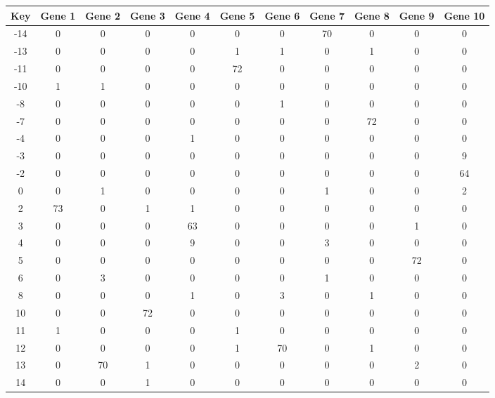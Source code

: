 \begin{tabular}{|c|c|c|c|c|c|c|c|c|c|c|}
\hline
Key & Gene 1 & Gene 2 & Gene 3 & Gene 4 & Gene 5 & Gene 6 & Gene 7 & Gene 8 & Gene 9 & Gene 10 \\
\hline
-14 & 0 & 0 & 0 & 0 & 0 & 0 & 70 & 0 & 0 & 0 \\
-13 & 0 & 0 & 0 & 0 & 1 & 1 & 0 & 1 & 0 & 0 \\
-11 & 0 & 0 & 0 & 0 & 72 & 0 & 0 & 0 & 0 & 0 \\
-10 & 1 & 1 & 0 & 0 & 0 & 0 & 0 & 0 & 0 & 0 \\
-8 & 0 & 0 & 0 & 0 & 0 & 1 & 0 & 0 & 0 & 0 \\
-7 & 0 & 0 & 0 & 0 & 0 & 0 & 0 & 72 & 0 & 0 \\
-4 & 0 & 0 & 0 & 1 & 0 & 0 & 0 & 0 & 0 & 0 \\
-3 & 0 & 0 & 0 & 0 & 0 & 0 & 0 & 0 & 0 & 9 \\
-2 & 0 & 0 & 0 & 0 & 0 & 0 & 0 & 0 & 0 & 64 \\
0 & 0 & 1 & 0 & 0 & 0 & 0 & 1 & 0 & 0 & 2 \\
2 & 73 & 0 & 1 & 1 & 0 & 0 & 0 & 0 & 0 & 0 \\
3 & 0 & 0 & 0 & 63 & 0 & 0 & 0 & 0 & 1 & 0 \\
4 & 0 & 0 & 0 & 9 & 0 & 0 & 3 & 0 & 0 & 0 \\
5 & 0 & 0 & 0 & 0 & 0 & 0 & 0 & 0 & 72 & 0 \\
6 & 0 & 3 & 0 & 0 & 0 & 0 & 1 & 0 & 0 & 0 \\
8 & 0 & 0 & 0 & 1 & 0 & 3 & 0 & 1 & 0 & 0 \\
10 & 0 & 0 & 72 & 0 & 0 & 0 & 0 & 0 & 0 & 0 \\
11 & 1 & 0 & 0 & 0 & 1 & 0 & 0 & 0 & 0 & 0 \\
12 & 0 & 0 & 0 & 0 & 1 & 70 & 0 & 1 & 0 & 0 \\
13 & 0 & 70 & 1 & 0 & 0 & 0 & 0 & 0 & 2 & 0 \\
14 & 0 & 0 & 1 & 0 & 0 & 0 & 0 & 0 & 0 & 0 \\
\hline
\end{tabular}